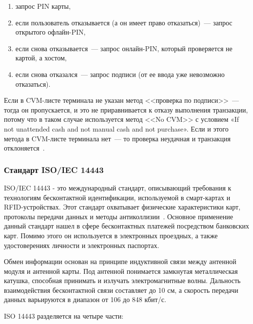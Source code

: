 \begin{enumerate}
    \item запрос PIN карты,
    \item если пользователь отказывается (а он имеет право отказаться)~--- запрос открытого офлайн-PIN,
    \item если снова отказывается~--- запрос онлайн-PIN, который проверяется не картой, а хостом,
    \item если снова отказался~--- запрос подписи (от ее ввода уже невозможно отказаться).
\end{enumerate}

Если в CVM-листе терминала не указан метод <<проверка по подписи>>~--- тогда он пропускается, и это не приравнивается к отказу выполнения транзакции, потому что в таком случае используется метод <<No CVM>> с условием «If not unattended cash and not manual cash and not purchase».
Если и этого метода в CVM-листе терминала нет~--– то проверка неудачная и транзакция отклоняется~\cite{habr_cvm}.


\subsubsection{Стандарт ISO/IEC 14443}

ISO/IEC 14443 - это международный стандарт, описывающий требования к технологиям бесконтактной идентификации, используемой в смарт-картах и
RFID-устройствах. 
Этот стандарт охватывает физические характеристики карт, протоколы передачи данных и методы антиколлизии~\cite{iso_14443}.
Основное применение данный стандарт нашел в сфере бесконтактных платежей посредством банковских карт.
Помимо этого он используется в электронных проездных, а также удостоверениях личности и электронных паспортах.

Обмен информации основан на принципе индуктивной связи между антенной модуля и антенной карты.
Под антенной понимается замкнутая металлическая катушка, способная принимать и излучать электромагнитные волны.
Дальность взаимодействия бесконтактной связи составляет до 10 см, а скорость передачи данных варьируются в диапазон от 106 до 848 кбит/с.

ISO 14443 разделяется на четыре части:

